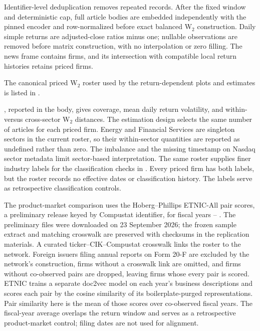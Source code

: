 Identifier-level deduplication removes
 repeated records. After the fixed window
and deterministic cap, full article bodies are embedded independently with the
pinned encoder and row-normalized before exact balanced W$_2$ construction.
Daily simple returns are adjusted-close ratios minus one; nullable observations
are removed before matrix construction, with no interpolation or zero filling.
The news frame contains  firms, and its intersection with
compatible local return histories retains  priced firms.

The canonical priced W$_2$ roster used by the return-dependent plots and
estimates is listed in .



, reported in the body, gives coverage,
mean daily return volatility, and within- versus cross-sector W$_2$ distances.
The estimation design selects the same number of articles for each priced
firm. Energy and Financial Services
are singleton sectors in the current roster, so their within-sector quantities
are reported as undefined rather than zero. The imbalance and the missing
timestamp on Nasdaq sector metadata limit sector-based interpretation.
The same roster supplies  finer
industry labels for the classification checks in
.
Every priced firm has both labels, but the roster records no effective dates
or classification history.
The labels serve as retrospective classification controls.

The product-market comparison uses the Hoberg--Phillips ETNIC-All pair
scores, a preliminary release keyed by Compustat identifier, for fiscal years
--
\citep{hoberg_phillips_2016,hoberg2025scope}.
The preliminary files were downloaded on 23 September 2026; the frozen
sample extract and matching crosswalk are preserved with checksums in the
replication materials.
A curated ticker--CIK--Compustat crosswalk links the roster to the network.
Foreign issuers filing annual reports on Form 20-F are excluded by the
network's construction, firms without a crosswalk link are omitted, and firms
without co-observed pairs are dropped, leaving  firms
whose every pair is scored.
ETNIC trains a separate doc2vec model on each year's business descriptions
and scores each pair by the cosine similarity of its boilerplate-purged
representations.
Pair similarity here is the mean of those scores over co-observed fiscal
years.
The fiscal-year average overlaps the return window and serves as a
retrospective product-market control; filing dates are not used for alignment.

